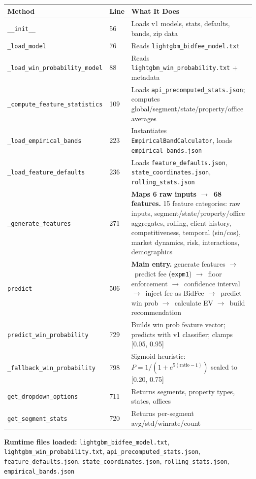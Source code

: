 \documentclass[11pt,a4paper]{article}
\newcommand{\file}[1]{\texttt{\color{gssblue!70!black}#1}}
\newcommand{\func}[1]{\texttt{\color{gssgreen!80!black}#1}}
\newcommand{\cls}[1]{\texttt{\color{uipurple}#1}}
\newcommand{\arrow}{$\rightarrow$}
\begin{document}
\begin{longtable}{l l p{7.5cm}}
\toprule
\textbf{Method} & \textbf{Line} & \textbf{What It Does} \\
\midrule
\endhead
\func{\_\_init\_\_} & 56 & Loads v1 models, stats, defaults, bands, zip data \\
\func{\_load\_model} & 76 & Reads \file{lightgbm\_bidfee\_model.txt} \\
\func{\_load\_win\_probability\_model} & 88 & Reads \file{lightgbm\_win\_probability.txt} + metadata \\
\func{\_compute\_feature\_statistics} & 109 & Loads \file{api\_precomputed\_stats.json}; computes global/segment/state/property/office averages \\
\func{\_load\_empirical\_bands} & 223 & Instantiates \cls{EmpiricalBandCalculator}, loads \file{empirical\_bands.json} \\
\func{\_load\_feature\_defaults} & 236 & Loads \file{feature\_defaults.json}, \file{state\_coordinates.json}, \file{rolling\_stats.json} \\
\func{\_generate\_features} & 271 & \textbf{Maps 6 raw inputs \arrow\ 68 features.} 15 feature categories: raw inputs, segment/state/property/office aggregates, rolling, client history, competitiveness, temporal (sin/cos), market dynamics, risk, interactions, demographics \\
\func{predict} & 506 & \textbf{Main entry.} generate features \arrow\ predict fee (\texttt{expm1}) \arrow\ floor enforcement \arrow\ confidence interval \arrow\ inject fee as BidFee \arrow\ predict win prob \arrow\ calculate EV \arrow\ build recommendation \\
\func{predict\_win\_probability} & 729 & Builds win prob feature vector; predicts with v1 classifier; clamps [0.05, 0.95] \\
\func{\_fallback\_win\_probability} & 798 & Sigmoid heuristic: $P = 1/(1+e^{5(\text{ratio}-1)})$ scaled to [0.20, 0.75] \\
\func{get\_dropdown\_options} & 711 & Returns segments, property types, states, offices \\
\func{get\_segment\_stats} & 720 & Returns per-segment avg/std/winrate/count \\
\bottomrule
\end{longtable}

\textbf{Runtime files loaded:} \file{lightgbm\_bidfee\_model.txt}, \file{lightgbm\_win\_probability.txt}, \file{api\_precomputed\_stats.json}, \file{feature\_defaults.json}, \file{state\_coordinates.json}, \file{rolling\_stats.json}, \file{empirical\_bands.json}
\end{document}
